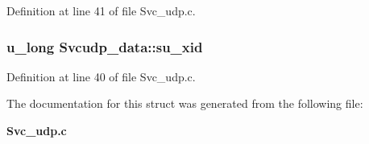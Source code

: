 Definition at line 41 of file Svc\_\-udp.c.
\subsubsection{\setlength{\rightskip}{0pt plus 5cm}u\_\-long {\bf Svcudp\_\-data::su\_\-xid}}\label{structSvcudp__data_o1}




Definition at line 40 of file Svc\_\-udp.c.

The documentation for this struct was generated from the following file:\begin{CompactItemize}
\item 
{\bf Svc\_\-udp.c}\end{CompactItemize}
